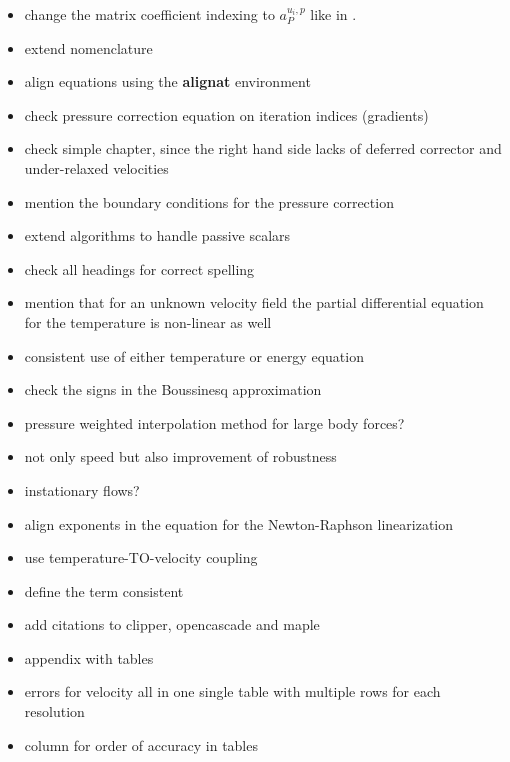 \documentclass[article,type=msc,colorback,accentcolor=tud2a]{tudthesis}
\begin{document}
  \begin{itemize}
    \item change the matrix coefficient indexing to \(a_P^{u_i,p}\) like in \cite{darwish09}.
    \item extend nomenclature
    \item align equations using the \textbf{alignat} environment
    \item check pressure correction equation on iteration indices (gradients)
    \item check simple chapter, since the right hand side lacks of deferred corrector and under-relaxed velocities
    \item mention the boundary conditions for the pressure correction
    \item extend algorithms to handle passive scalars
    \item check all headings for correct spelling
    \item mention that for an unknown velocity field the partial differential equation for the temperature is non-linear as well
    \item consistent use of either temperature or energy equation
    \item check the signs in the Boussinesq approximation
    \item pressure weighted interpolation method for large body forces?
    \item not only speed but also improvement of robustness
    \item instationary flows?
    \item align exponents in the equation for the Newton-Raphson linearization
    \item use temperature-TO-velocity coupling
    \item define the term consistent
    \item add citations to clipper, opencascade and maple
    \item appendix with tables
    \item errors for velocity all in one single table with multiple rows for each resolution
    \item column for order of accuracy in tables 
  \end{itemize}

  
  
  
  
  
  
  
  
  

    \nocite{*}

\clearpage
{}

\end{document}
